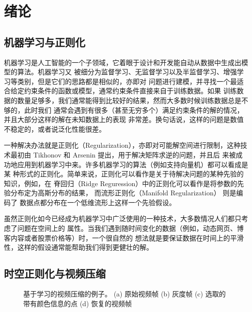 \chapter{绪论}

\section{机器学习与正则化}

机器学习是人工智能的一个子领域，它着眼于设计和开发能自动从数据中生成出模型的算法。机器学习又
被细分为监督学习、无监督学习以及半监督学习、增强学习等类别，但是它们的思路都是相似的，亦即对
问题进行建模，并寻找一个最适合给定约束条件的函数或模型，通常约束条件直接来自于训练数据。如果
训练数据的数量足够多，我们通常能得到比较好的结果，然而大多数时候训练数据总是不够的，此时我们
通常会遇到有很多（甚至无穷多个）满足约束条件的解的情况，并且大部分这样的解在未知数据上的表现
非常差。换句话说，这样的问题是数值不稳定的，或者说泛化性能很差。

一种解决办法就是正则化（Regularization），亦即对可能解空间进行限制，这种技术最初由
Tikhonov 和 Arsenin \cite{tikhomirov1960dsf} 提出，用于解决矩阵求逆的问题，并且后
来被成功地应用到机器学习中来。许多机器学习的算法（例如支持向量机）都可以看成是某
种形式的正则化。简单来说，正则化可以看作是关于待解决问题的某种先验的知识，例如，在
脊回归（Ridge Reguression）中的正则化可以看作是将参数的先验分布定为高斯分布的结果，
而流形正则化（Manifold Regularization）\cite{On-Manifold-Regularization} 则是编码了
数据点都分布在一个低维流形上这样一个先验假设。

虽然正则化如今已经成为机器学习中广泛使用的一种技术，大多数情况人们都只考虑了问题在空间上的
属性。当我们遇到随时间变化的数据（例如，动态网页、博客内容或者股票价格等）时，一个很自然的
想法就是要保证数据在时间上的平滑性，这样的假设通常能帮助我们得到更健壮的解。

\section{时空正则化与视频压缩}

\begin{figure}
\caption{\label{fig:cycle}基于学习的视频压缩的例子。 (a) 原始视频帧
(b) 灰度帧 (c) 选取的带有颜色信息的点 (d) 恢复的视频帧}
\end{figure}

